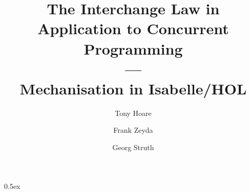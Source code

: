 \documentclass[11pt,a4paper]{article}
\begin{document}
\title{The Interchange Law in Application to Concurrent Programming\\---\\Mechanisation in Isabelle/HOL}

\author{Tony Hoare \and Frank Zeyda \and Georg Struth}



\maketitle


\begin{abstract}
\end{abstract}


\tableofcontents
\newpage

\parindent 0pt\parskip 0.5ex




\newpage


\newpage


\newpage




%
%

\end{document}
